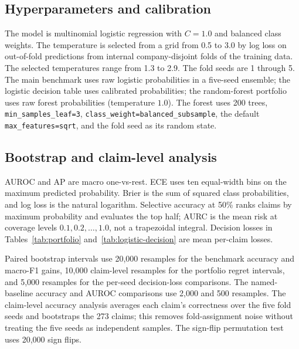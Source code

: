 \documentclass[11pt]{article}
\begin{document}
\subsection{Hyperparameters and calibration}
The model is multinomial logistic regression with $C=1.0$ and balanced class weights. The temperature is selected from a grid from 0.5 to 3.0 by log loss on out-of-fold predictions from internal company-disjoint folds of the training data. The selected temperatures range from 1.3 to 2.9. The fold seeds are 1 through 5. The main benchmark uses raw logistic probabilities in a five-seed ensemble; the logistic decision table uses calibrated probabilities; the random-forest portfolio uses raw forest probabilities (temperature $1.0$). The forest uses 200 trees, \texttt{min\_samples\_leaf=3}, \texttt{class\_weight=balanced\_subsample}, the default \texttt{max\_features=sqrt}, and the fold seed as its random state.

\subsection{Bootstrap and claim-level analysis}
AUROC and AP are macro one-vs-rest. ECE uses ten equal-width bins on the
maximum predicted probability. Brier is the sum of squared class probabilities,
and log loss is the natural logarithm. Selective accuracy at 50\% ranks claims
by maximum probability and evaluates the top half; AURC is the mean risk at
coverage levels $0.1,0.2,\dots,1.0$, not a trapezoidal integral. Decision
losses in Tables~\ref{tab:portfolio} and~\ref{tab:logistic-decision} are mean
per-claim losses.

Paired bootstrap intervals use 20,000 resamples for the benchmark accuracy and macro-F1 gains, 10,000 claim-level resamples for the portfolio regret intervals, and 5,000 resamples for the per-seed decision-loss comparisons. The named-baseline accuracy and AUROC comparisons use 2,000 and 500 resamples. The claim-level accuracy analysis averages each claim's correctness over the five fold seeds and bootstraps the 273 claims; this removes fold-assignment noise without treating the five seeds as independent samples. The sign-flip permutation test uses 20,000 sign flips.
\end{document}
